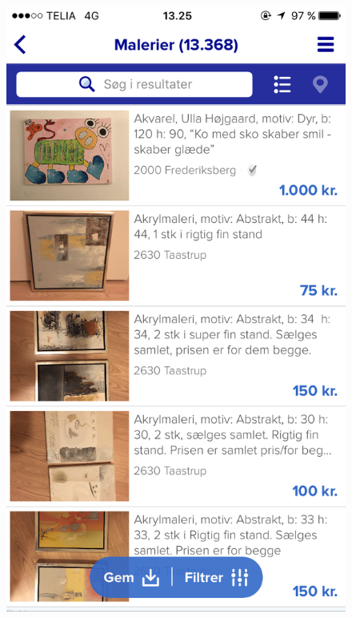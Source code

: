 \begin{figure}[H]
\begin{minipage}[b]{0.285\linewidth}
    \includegraphics[width=\linewidth]{Appendix/ScreenshotsCompetitorsPlatforms/DBA-min.png}
    \label{DBADisplay}
  \end{minipage}
\end{figure}


